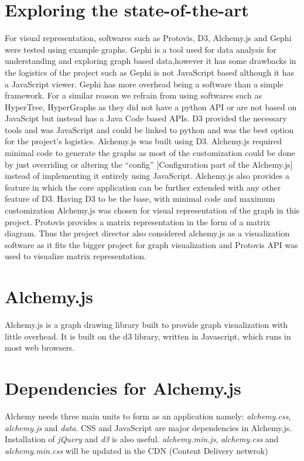 \section{Exploring the state-of-the-art}
For visual representation, softwares such as Protovis, D3, Alchemy.js and Gephi were tested
using example graphs.  Gephi is a tool
used for data analysis for understanding and exploring graph based data,however it has some
drawbacks in the logistics of the project such as Gephi is not JavaScript based although it has a JavaScript viewer. Gephi has more overhead being a software than a simple framework. For a similar reason we refrain from using softwares such as HyperTree, HyperGraphs as they did not have a python API or are not based on JavaScipt but instead has a
Java Code based APIs.  D3
provided the necessary tools and was JavaScript and could be linked to python and was the best
option for the project's logistics. Alchemy.js was built using D3. Alchemy.js required minimal code
to generate the graphs as most of the customization could be done by just overriding or altering the
“config” [Configuration part of the Alchemy.js] instead of implementing it entirely using
JavaScript. Alchemy.js also provides a feature in which the core application can be further extended
with any other feature of D3. Having D3 to be the base, with minimal code and maximum
customization Alchemy.js was chosen for visual representation of the graph in this project. Protovis provides a matrix representation in the form of a matrix diagram.  Thus the project director also considered alchemy.js as a visualization software as it fits the bigger project for graph visualization and Protovis API was used to visualize matrix representation. 


\section{Alchemy.js}

Alchemy.js is a graph drawing library built to provide graph visualization with little overhead. It is built on the d3 library, written in Javascript, which runs in most web browsers.   

\section{Dependencies for Alchemy.js}
Alchemy needs three main units to  form as an application namely:  \textit{alchemy.css}, \textit{alchemy.js} and \textit{data}. CSS and JavaScript are major dependencies in Alchemy.js. Installation of \textit{jQuery} and \textit{d3} is also useful. \textit{alchemy.min.js}, \textit{alchemy.css} and \textit{alchemy.min.css } will be updated in the CDN (Content Delivery netwrok)
